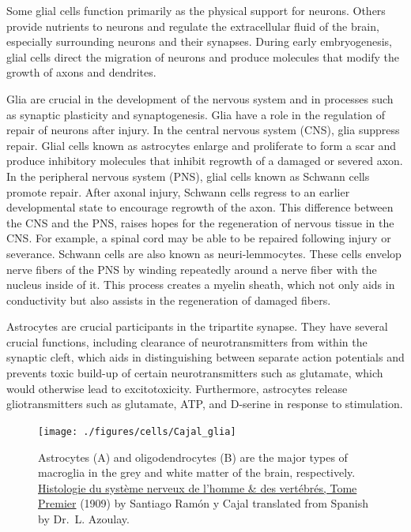 Some glial cells function primarily as the physical support for neurons. Others provide nutrients to neurons and regulate the extracellular fluid of the brain, especially surrounding neurons and their synapses. During early embryogenesis, glial cells direct the migration of neurons and produce molecules that modify the growth of axons and dendrites.

Glia are crucial in the development of the nervous system and in processes such as synaptic plasticity and synaptogenesis. Glia have a role in the regulation of repair of neurons after injury. In the central nervous system (CNS), glia suppress repair. Glial cells known as astrocytes enlarge and proliferate to form a scar and produce inhibitory molecules that inhibit regrowth of a damaged or severed axon. In the peripheral nervous system (PNS), glial cells known as Schwann cells promote repair. After axonal injury, Schwann cells regress to an earlier developmental state to encourage regrowth of the axon. This difference between the CNS and the PNS, raises hopes for the regeneration of nervous tissue in the CNS. For example, a spinal cord may be able to be repaired following injury or severance. Schwann cells are also known as neuri-lemmocytes. These cells envelop nerve fibers of the PNS by winding repeatedly around a nerve fiber with the nucleus inside of it. This process creates a myelin sheath, which not only aids in conductivity but also assists in the regeneration of damaged fibers.

Astrocytes are crucial participants in the tripartite synapse. They have several crucial functions, including clearance of neurotransmitters from within the synaptic cleft, which aids in distinguishing between separate action potentials and prevents toxic build-up of certain neurotransmitters such as glutamate, which would otherwise lead to excitotoxicity. Furthermore, astrocytes release gliotransmitters such as glutamate, ATP, and D-serine in response to stimulation.



\begin{figure}

{\centering \texttt{[image: ./figures/cells/Cajal\_glia]} 

}

\caption{Astrocytes (A) and oligodendrocytes (B) are the major types of macroglia in the grey and white matter of the brain, respectively. \href{https://wellcomelibrary.org/item/b2129592x\#?c=0\&m=0\&s=0\&cv=14\&z=0\%2C-3.48\%2C1\%2C8.6591}{Histologie du système nerveux de l'homme \& des vertébrés, Tome Premier} (1909) by Santiago Ramón y Cajal translated from Spanish by Dr.~L. Azoulay.}\label{fig:astrocytes}
\end{figure}

